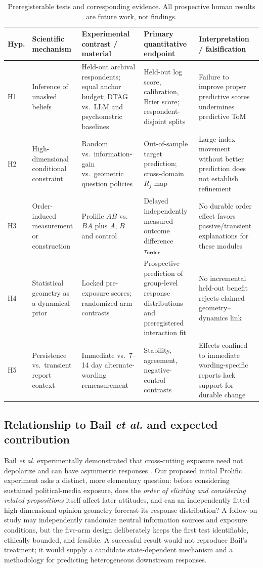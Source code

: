 \documentclass[journal,10pt]{IEEEtran}
\begin{document}
\begin{table}[!t]
\centering
\caption{Preregisterable tests and corresponding evidence. All prospective human results are future work, not findings.}
\label{tab:design}
\renewcommand{\arraystretch}{1.18}
\begin{tabularx}{\textwidth}{@{}p{.40in}p{1.23in}p{1.56in}p{1.72in}X@{}}
\toprule
Hyp. & Scientific mechanism & Experimental contrast / material & Primary quantitative endpoint & Interpretation / falsification \\
\midrule
H1 & Inference of unasked beliefs & Held-out archival respondents; equal anchor budget; DTAG vs.\ LLM and psychometric baselines & Held-out log score, calibration, Brier score; respondent-disjoint splits & Failure to improve proper predictive scores undermines predictive ToM \\
H2 & High-dimensional conditional constraint & Random vs.\ information-gain vs.\ geometric question policies & Out-of-sample target prediction; cross-domain $R_j$ map & Large index movement without better prediction does not establish refinement \\
H3 & Order-induced measurement or construction & Prolific $AB$ vs.\ $BA$ plus $A$, $B$ and control & Delayed independently measured outcome difference $\tau_{\rm order}$ & No durable order effect favors passive/transient explanations for these modules \\
H4 & Statistical geometry as a dynamical prior & Locked pre-exposure scores; randomized arm contrasts & Prospective prediction of group-level response distributions and preregistered interaction fit & No incremental held-out benefit rejects claimed geometry--dynamics link \\
H5 & Persistence vs.\ transient report context & Immediate vs.\ 7--14 day alternate-wording remeasurement & Stability, agreement, negative-control contrasts & Effects confined to immediate wording-specific reports lack support for durable change \\
\bottomrule
\end{tabularx}
\end{table}

\subsection{Relationship to Bail \emph{et al.} and expected contribution}
Bail \emph{et al.} experimentally demonstrated that cross-cutting exposure need not depolarize and can have asymmetric responses \cite{bail2018}. Our proposed initial Prolific experiment asks a distinct, more elementary question: before considering sustained political-media exposure, does the \emph{order of eliciting and considering related propositions} itself affect later attitudes, and can an independently fitted high-dimensional opinion geometry forecast its response distribution? A follow-on study may independently randomize neutral information sources and exposure conditions, but the five-arm design deliberately keeps the first test identifiable, ethically bounded, and feasible. A successful result would not reproduce Bail's treatment; it would supply a candidate state-dependent mechanism and a methodology for predicting heterogeneous downstream responses.
\end{document}
